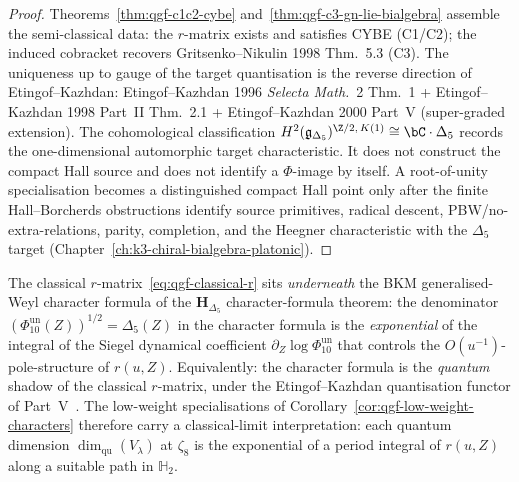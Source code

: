 \begin{proof}
Theorems~\ref{thm:qgf-c1c2-cybe}
and~\ref{thm:qgf-c3-gn-lie-bialgebra} assemble the
semi-classical data: the $r$-matrix exists and satisfies CYBE (C1/C2);
the induced cobracket recovers Gritsenko--Nikulin 1998 Thm.~5.3 (C3).
The uniqueness up to gauge of the target quantisation is the reverse
direction of Etingof--Kazhdan: Etingof--Kazhdan 1996 \emph{Selecta
Math.}~2 Thm.~1 + Etingof--Kazhdan 1998 Part~II Thm.~2.1 +
Etingof--Kazhdan 2000 Part~V (super-graded extension). The
cohomological classification
$H^2(\mathfrak g_{\Delta_5})^{\Z/2,\,K(1)} \cong \bC\cdot\Delta_5$
records the one-dimensional automorphic target characteristic.
It does not construct the compact Hall source and does not identify a
\(\Phi\)-image by itself. A root-of-unity specialisation becomes a
distinguished compact Hall point only after
the finite Hall--Borcherds obstructions identify source primitives, radical
descent, PBW/no-extra-relations, parity, completion, and the Heegner
characteristic with the $\Delta_5$ target
(Chapter~\ref{ch:k3-chiral-bialgebra-platonic}).
\end{proof}

\begin{remark}
\label{rem:qgf-kazhdan-vol3-bridge}
The classical $r$-matrix~\eqref{eq:qgf-classical-r} sits
\emph{underneath} the BKM generalised-Weyl character formula of
the $\mathbf H_{\Delta_5}$ character-formula theorem: the denominator
$(\Phi_{10}^{\mathrm{un}}(Z))^{1/2} = \Delta_5(Z)$ in the character formula
is the \emph{exponential} of the integral of the Siegel dynamical
coefficient $\partial_Z\log\Phi_{10}^{\mathrm{un}}$ that controls the
$O(u^{-1})$-pole-structure of $r(u, Z)$. Equivalently: the
character formula is the \emph{quantum} shadow of the classical
$r$-matrix, under the Etingof--Kazhdan quantisation functor of
Part~V~\cite{EtingofKazhdan2007PartV}. The low-weight
specialisations of Corollary~\ref{cor:qgf-low-weight-characters}
therefore carry a classical-limit interpretation: each quantum
dimension $\dim_{\mathrm{qu}}(V_\lambda)$ at $\zeta_8$ is the
exponential of a period integral of $r(u, Z)$ along a suitable
path in $\mathbb H_2$.
\end{remark}

